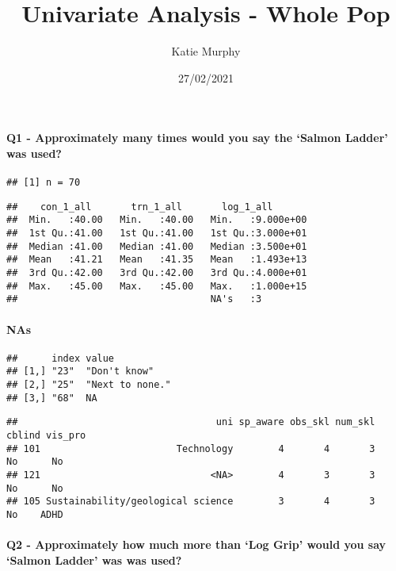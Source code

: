 \documentclass[
]{article}
\title{Univariate Analysis - Whole Pop}
\author{Katie Murphy}
\date{27/02/2021}
\begin{document}
\maketitle

\hypertarget{q1---approximately-many-times-would-you-say-the-salmon-ladder-was-used}{%
\paragraph{\texorpdfstring{\textbf{Q1 - Approximately many times would
you say the `Salmon Ladder' was
used?}}{Q1 - Approximately many times would you say the `Salmon Ladder' was used?}}\label{q1---approximately-many-times-would-you-say-the-salmon-ladder-was-used}}

\begin{verbatim}
## [1] n = 70
\end{verbatim}

\begin{verbatim}
##    con_1_all       trn_1_all       log_1_all        
##  Min.   :40.00   Min.   :40.00   Min.   :9.000e+00  
##  1st Qu.:41.00   1st Qu.:41.00   1st Qu.:3.000e+01  
##  Median :41.00   Median :41.00   Median :3.500e+01  
##  Mean   :41.21   Mean   :41.35   Mean   :1.493e+13  
##  3rd Qu.:42.00   3rd Qu.:42.00   3rd Qu.:4.000e+01  
##  Max.   :45.00   Max.   :45.00   Max.   :1.000e+15  
##                                  NA's   :3
\end{verbatim}

\hypertarget{nas}{%
\paragraph{NAs}\label{nas}}

\begin{verbatim}
##      index value          
## [1,] "23"  "Don't know"   
## [2,] "25"  "Next to none."
## [3,] "68"  NA
\end{verbatim}

\begin{verbatim}
##                                   uni sp_aware obs_skl num_skl cblind vis_pro
## 101                        Technology        4       4       3     No      No
## 121                              <NA>        4       3       3     No      No
## 105 Sustainability/geological science        3       4       3     No    ADHD
\end{verbatim}

\hypertarget{q2---approximately-how-much-more-than-log-grip-would-you-say-salmon-ladder-was-was-used}{%
\paragraph{\texorpdfstring{\textbf{Q2 - Approximately how much more than
`Log Grip' would you say `Salmon Ladder' was was
used?}}{Q2 - Approximately how much more than `Log Grip' would you say `Salmon Ladder' was was used?}}\label{q2---approximately-how-much-more-than-log-grip-would-you-say-salmon-ladder-was-was-used}}
\end{document}
